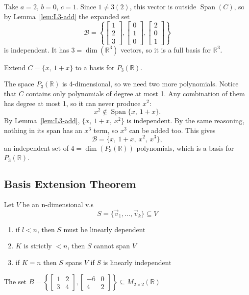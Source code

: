 \begin{example}
\begin{solution}
Take $a = 2$, $b = 0$, $c = 1$. Since $1 \neq 3(2)$, this vector is outside $\operatorname{Span}(C)$, so by Lemma~\ref{lem:L3-add} the expanded set
\[
\mathcal{B} = \left\{ \begin{bmatrix} 1 \\ 2 \\ 3 \end{bmatrix}, \begin{bmatrix} 0 \\ 1 \\ 0 \end{bmatrix}, \begin{bmatrix} 2 \\ 0 \\ 1 \end{bmatrix} \right\}
\]
is independent. It has $3 = \dim(\mathbb{R}^3)$ vectors, so it is a full basis for $\mathbb{R}^3$.
\end{solution}
\end{example}

\begin{example}
Extend $C = \{x, \ 1 + x\}$ to a basis for $P_3(\mathbb{R})$.

\begin{solution}
The space $P_3(\mathbb{R})$ is 4-dimensional, so we need two more polynomials. Notice that $C$ contains only polynomials of degree at most 1. Any combination of them has degree at most 1, so it can never produce $x^2$:
\[
x^2 \notin \operatorname{Span}\{x, \ 1 + x\}.
\]
By Lemma~\ref{lem:L3-add}, $\{x, \ 1 + x, \ x^2\}$ is independent. By the same reasoning, nothing in its span has an $x^3$ term, so $x^3$ can be added too. This gives
\[
\mathcal{B} = \{x, \ 1 + x, \ x^2, \ x^3\},
\]
an independent set of $4 = \dim(P_3(\mathbb{R}))$ polynomials, which is a basis for $P_3(\mathbb{R})$.
\end{solution}
\end{example}

\subsection{Basis Extension Theorem}

Let $V$ be an n-dimensional v.s 
\[
S = \{\vec{v}_1, \dots, \vec{v}_k\} \subseteq V
\]

\smallskip

\begin{enumerate}
\item if $l < n$, then $S$ must be linearly dependent
\item $K$ is strictly $ < n$, then $S$ cannot span $V$
\item if $K = n$ then $S$ spans $V$ if $S$ is linearly independent
\end{enumerate}

The set $B = \left\{ \begin{bmatrix} 1 & 2 \\ 3 & 4 \end{bmatrix}, \begin{bmatrix} -6 & 0 \\ 4 & 2 \end{bmatrix} \right\} \subseteq M_{2\times 2}(\mathbb{R})$

